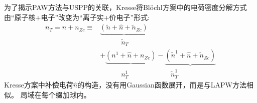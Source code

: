 为了揭示\textrm{PAW}方法与\textrm{USPP}的关联，\textrm{Kresse}将\textrm{Bl\"ochl}方案中的电荷密度分解方式由“原子核+电子”改变为“离子实+价电子”形式:~
\begin{equation}
	\begin{aligned}
		n_T=n+n_{Zc}\equiv&\underbrace{(\tilde n+\hat n+\tilde n_{Zc})}\\
				 		&\quad\qquad\tilde n_T\\
				  &+\underbrace{(n^1+\hat n+n_{Zc})}-\underbrace{(\tilde n^1+\hat n+\tilde n_{Zc})}\\
				                  &\quad\qquad n_T^1\qquad\qquad\qquad\tilde n_T^1
	\end{aligned}
	\label{eq:PAW_Kresse_02}
\end{equation}
\textrm{Kresse}方案中补偿电荷$\hat n$的构造，没有用\textrm{Gaussian}函数展开，而是与\textrm{LAPW}方法相似。
局域在每个缀加球内。

